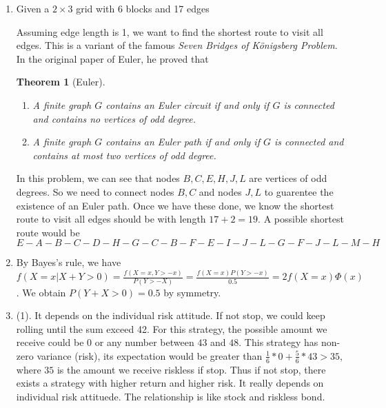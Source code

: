 \documentclass[10pt]{article}
\newtheorem*{theorem*}{Theorem}
\begin{document}
\begin{enumerate}
\item %
Given a $2\times 3$ grid with 6 blocks and 17 edges\\
\begin{center}
\end{center}
Assuming edge length is 1, we want to find the shortest route to visit all edges. This is a variant of the famous \emph{Seven Bridges of K\"{o}nigsberg Problem}. In the original paper of Euler, he proved that

\begin{theorem*}[Euler]
\begin{enumerate}
\item A finite graph $G$ contains an Euler circuit if and only if $G$ is connected and contains no vertices of odd degree.
\item A finite graph $G$ contains an Euler path if and only if $G$ is connected and contains at most two vertices of odd degree.
\end{enumerate}
\end{theorem*}

In this problem, we can see that nodes $B, C, E, H, J, L$ are vertices of odd degrees. So we need to connect nodes $B, C$ and nodes $J, L$ to guarentee the existence of an Euler path. Once we have these done, we know the shortest route to visit all edges should be with length $17+2 = 19$. A possible shortest route would be
$$E-A-B-C-D-H-G-C-B-F-E-I-J-L-G-F-J-L-M-H$$

\item %
By Bayes's rule, we have $f(X=x|X+Y>0)=\frac{f(X=x, Y>-x)}{P(Y>-X)}=\frac{f(X=x)P(Y>-x)}{0.5}=2f(X=x)\Phi(x)$. We obtain $P(Y+X>0) = 0.5$ by symmetry. 

\item %
(1). It depends on the individual risk attitude. If not stop, we could keep rolling until the sum exceed 42. For this strategy, the possible amount we receive could be $0$ or any number between $43$ and $48$. This strategy has non-zero variance (risk), its expectation would be greater than $\frac{1}{6}*0+\frac{5}{6}*43>35$, where $35$ is the amount we receive riskless if stop. Thus if not stop, there exists a strategy with higher return and higher risk. It really depends on individual risk attituede. The relationship is like stock and riskless bond.


\end{enumerate}
\end{document}
